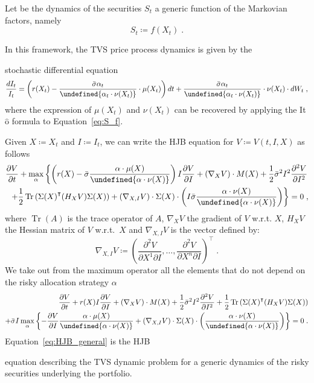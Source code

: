 \documentclass[runningheads]{m2ef}
\DeclareMathOperator{\Tr}{Tr}
\newcommand{\tr}[1]{{#1}^{\intercal}} %
\let\norm\undefined %
\DeclarePairedDelimiter\norm{\lVert}{\rVert}
\newcommand\soutpars[1]{\let\helpcmd\sout\parhelp#1\par\relax\relax}
\newcommand{\change}[1]{{\color{red} {#1}}}%
\newcommand{\remove}[1]{{\color{red} \soutpars{{#1}}}}%
\begin{document}
Let be the dynamics of the securities $S_t$ a generic function of the Markovian factors, namely
\begin{equation}
 S_t \coloneqq  f(X_t) \; .
\label{eq:S_f}\end{equation}

In this framework, the TVS price process dynamics is given by the \remove{SDE} \change{stochastic differential equation} 
\begin{equation}
	\frac{dI_t}{I_t} = \left(r(X_t) -  \frac{\bar{\sigma} \alpha_t}{\norm{\alpha_t \cdot \nu(X_t)}}  \cdot \mu(X_t)    \right)dt +\frac{\bar{\sigma}\alpha_t }{\norm{ \alpha_t \cdot \nu(X_t) }} \cdot \nu(X_t) \cdot dW_t \; ,
\end{equation}
where the expression of $\mu(X_t)$ and $\nu(X_t)$ can be recovered by applying the It$\hat{\text{o}}$ formula to Equation~\eqref{eq:S_f}.

Given $X \coloneqq X_t$ and $I \coloneqq I_t$, we can write the HJB equation for $V \coloneqq V(t,I,X)$ as follows
\begin{equation}
	\begin{aligned}
		\frac{\partial V}{\partial t} + \max_\alpha  \left\{   \left(r(X) - \bar{\sigma}\frac{\alpha \cdot \mu(X)}{\norm{\alpha \cdot \nu(X)}}\right) I \frac{\partial V}{\partial I} + (\nabla_X V) \cdot M(X) + \frac{1}{2} \bar{\sigma}^2I^2 \frac{\partial^2V}{\partial I^2}  \right.\\ 
		\left. +\frac{1}{2}\Tr\left(\tr{\Sigma(X)}(H_XV)\Sigma(X)\right)  + (\nabla_{X,I}V) \cdot \Sigma(X) \cdot \left(I\bar{\sigma}\frac{\alpha \cdot \nu(X)}{\norm{\alpha \cdot \nu(X)}}\right)\right\} = 0 \; ,
	\end{aligned}
\end{equation}
where $\Tr(A)$ is the trace operator of $A$, $\nabla_X V$ the gradient of $V$ w.r.t. $X$, $H_XV$ the Hessian matrix of $V$ w.r.t.~$X$ and $\nabla_{X,I}V$ is the vector defined by:
\begin{equation}
	\nabla_{X,I} V \coloneqq \tr{\left(\frac{\partial^2 V}{\partial X^1 \partial I},\dots, \frac{\partial^2 V}{\partial X^n \partial I} \right)} \; .
\end{equation}
We take out from the maximum operator all the elements that do not depend on the risky allocation strategy $\alpha$
\begin{equation}
	\begin{aligned}
		\frac{\partial V}{\partial t} +   r(X) I \frac{\partial V}{\partial I} + (\nabla_X V) \cdot M(X) + \frac{1}{2} \bar{\sigma}^2I^2 \frac{\partial^2V}{\partial I^2} + \frac{1}{2}\Tr\left(\tr{\Sigma(X)}(H_XV)\Sigma(X)\right)  \\ 
		+\bar{\sigma}I\max_\alpha  \left\{  -\frac{\partial V}{\partial I}   \frac{\alpha \cdot \mu(X)}{\norm{\alpha \cdot \nu(X)}} + 
		(\nabla_{X,I}V) \cdot \Sigma(X) \cdot \left(\frac{\alpha \cdot \nu(X)}{\norm{\alpha \cdot \nu(X)}}\right)\right\} = 0 \; .
		\end{aligned}
\label{eq:HJB_general}\end{equation}
Equation~\eqref{eq:HJB_general} is the \change{HJB} \remove{Hamilton-Jacobi-Bellman}     equation describing the TVS dynamic problem for a generic dynamics of the risky securities underlying the portfolio.
\end{document}
